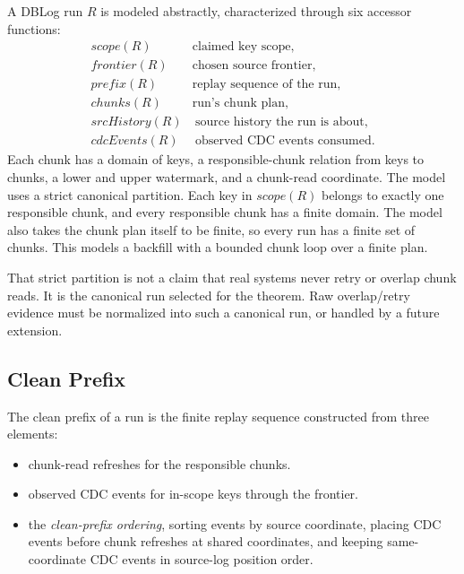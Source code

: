 \documentclass[letterpaper,10pt,twocolumn]{article}
\newcommand{\Scope}{\mathit{scope}}
\newcommand{\Frontier}{\mathit{frontier}}
\newcommand{\CleanPrefix}{\mathit{prefix}}
\newcommand{\Chunks}{\mathit{chunks}}
\newcommand{\SourceHistory}{\mathit{srcHistory}}
\newcommand{\CdcEvents}{\mathit{cdcEvents}}
\providecommand{\tightlist}{\setlength{\itemsep}{0pt}\setlength{\parskip}{0pt}}
\begin{document}
A DBLog run $R$ is modeled abstractly, characterized through six accessor functions:
\[
  \begin{aligned}
    \Scope(R)\quad             &\text{claimed key scope},\\
    \Frontier(R)\quad           &\text{chosen source frontier},\\
    \CleanPrefix(R)\quad        &\text{replay sequence of the run},\\
    \Chunks(R)\quad             &\text{run's chunk plan},\\
    \SourceHistory(R)           &\ \text{source history the run is about},\\
    \CdcEvents(R)               &\ \text{observed CDC events consumed.}
  \end{aligned}
\]
Each chunk has a domain of keys, a responsible-chunk relation from
keys to chunks, a lower and upper watermark, and a chunk-read
coordinate. The model uses a strict canonical partition. Each key in
$\Scope(R)$ belongs to exactly one responsible chunk, and every
responsible chunk has a finite domain. The model also takes the chunk
plan itself to be finite, so every run has a finite set of chunks. This
models a backfill with a bounded chunk loop over a finite plan.

That strict partition is not a claim that real systems never retry or
overlap chunk reads. It is the canonical run selected for the theorem.
Raw overlap/retry evidence must be normalized into such a canonical run,
or handled by a future extension.

\subsection{Clean Prefix}\label{clean-prefix}

The clean prefix of a run is the finite replay sequence constructed from three elements:

\begin{itemize}\tightlist
\item chunk-read refreshes for the responsible chunks.
\item observed CDC events for in-scope keys through the frontier.
\item the \emph{clean-prefix ordering}, sorting events by source
  coordinate, placing CDC events before chunk refreshes at
  shared coordinates, and keeping same-coordinate CDC events in
  source-log position order.
\end{itemize}
\end{document}
